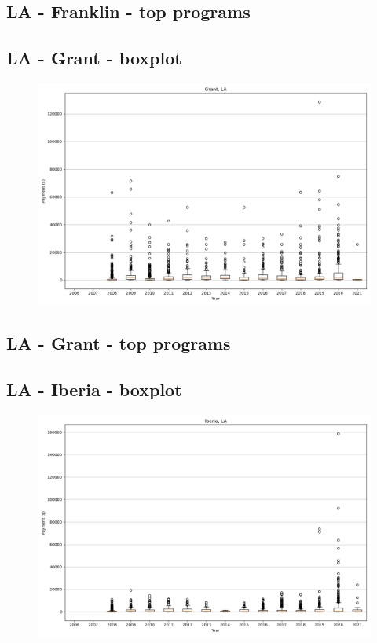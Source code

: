 \subsection*{LA - Franklin - top programs}

\newpage
\subsection*{LA - Grant - boxplot}
\begin{figure}[h]
\centering
\includegraphics[width=7in]{../output/boxplots/counties/Grant-LA_boxplot.png}
\end{figure}


\subsection*{LA - Grant - top programs}

\newpage
\subsection*{LA - Iberia - boxplot}
\begin{figure}[h]
\centering
\includegraphics[width=7in]{../output/boxplots/counties/Iberia-LA_boxplot.png}
\end{figure}


